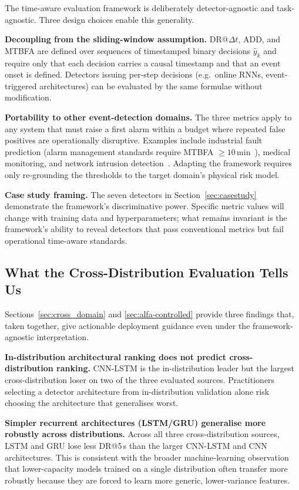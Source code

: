 \documentclass{ieeeaccess}
\begin{document}
The time-aware evaluation framework is deliberately detector-agnostic and
task-agnostic. Three design choices enable this generality.

\textbf{Decoupling from the sliding-window assumption.}
DR@$\Delta t$, ADD, and MTBFA are defined over sequences of timestamped binary
decisions $\hat{y}_k$ and require only that each decision carries a causal
timestamp and that an event onset is defined.
Detectors issuing per-step decisions (e.g.\ online RNNs, event-triggered
architectures) can be evaluated by the same formulae without modification.

\textbf{Portability to other event-detection domains.}
The three metrics apply to any system that must raise a first alarm within a
budget where repeated false positives are operationally disruptive.
Examples include industrial fault prediction (alarm management standards require
MTBFA $\geq 10\,\text{min}$~\cite{ref56}), medical monitoring, and network
intrusion detection~\cite{ref10}. Adapting the framework requires only
re-grounding the thresholds to the target domain's physical risk model.

\textbf{Case study framing.}
The seven detectors in Section~\ref{sec:casestudy} demonstrate the framework's
discriminative power. Specific metric values will change with training data and
hyperparameters; what remains invariant is the framework's ability to reveal
detectors that pass conventional metrics but fail operational time-aware standards.

\subsection{What the Cross-Distribution Evaluation Tells Us}
\label{sec:cross-discussion}

Sections~\ref{sec:cross_domain} and \ref{sec:alfa-controlled} provide three
findings that, taken together, give actionable deployment guidance even
under the framework-agnostic interpretation.

\textbf{In-distribution architectural ranking does not predict
cross-distribution ranking.}
CNN-LSTM is the in-distribution leader but the largest cross-distribution
loser on two of the three evaluated sources. Practitioners selecting a
detector architecture from in-distribution validation alone risk choosing
the architecture that generalises worst.

\textbf{Simpler recurrent architectures (LSTM/GRU) generalise more
robustly across distributions.}
Across all three cross-distribution sources, LSTM and GRU lose less
DR@5\,s than the larger CNN-LSTM and CNN architectures. This is consistent
with the broader machine-learning observation that lower-capacity models
trained on a single distribution often transfer more robustly because
they are forced to learn more generic, lower-variance features.
\end{document}

